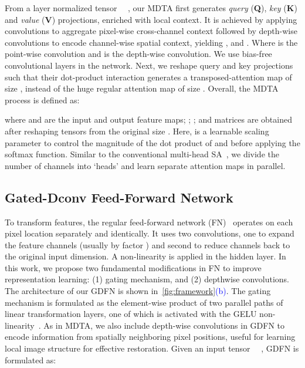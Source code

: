 \documentclass[10pt,twocolumn,letterpaper]{article}
\begin{document}
From a layer normalized tensor ~~, our MDTA first generates \emph{query} (\textbf{Q}), \emph{key} (\textbf{K}) and \emph{value} (\textbf{V}) projections, enriched with local context. It is achieved by applying  convolutions to aggregate pixel-wise cross-channel context followed by  depth-wise convolutions to encode channel-wise spatial context, yielding ,  and .  Where  is the  point-wise convolution and  is the  depth-wise convolution. We use bias-free convolutional layers in the network. Next, we reshape query and key projections such that their dot-product interaction generates a transposed-attention map  of size , instead of the huge regular attention map of size  \cite{vision_transformer,vaswani2017attention}. Overall, the MDTA process  is defined as:

where  and  are the input and output feature maps; ;  ; and  matrices are obtained after reshaping tensors from the original size . 
Here,  is a learnable scaling parameter to control the magnitude of the dot product of  and  before applying the softmax function. Similar to the conventional multi-head SA~\cite{vision_transformer}, we divide the number of channels into `heads' and learn separate attention maps {in parallel}.  


\subsection{Gated-Dconv Feed-Forward Network}\label{sec:GDFN}
To transform features, the regular feed-forward network (FN)~\cite{vaswani2017attention,vision_transformer} operates on each pixel location separately and identically. It uses two  convolutions, one to expand the feature channels (usually by factor ) and second to reduce channels back to the original input dimension. A non-linearity is applied in the hidden layer. 
In this work, we propose two fundamental modifications in FN to improve representation learning: (1) gating mechanism, and (2) depthwise convolutions. The architecture of our GDFN is shown in~\cref{fig:framework}\textcolor{blue}{(b)}. The gating mechanism is formulated as the element-wise product of two parallel paths of linear transformation layers, one of which is activated with the GELU non-linearity~\cite{hendrycks2016gaussian_gelu}. 
As in MDTA, we also include depth-wise convolutions in GDFN to encode information from spatially neighboring pixel positions, useful for learning local image structure for effective restoration. Given an input tensor ~~,  GDFN is formulated as:\vspace{-0.5em}
\end{document}

